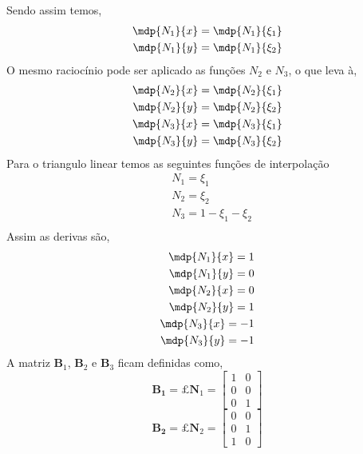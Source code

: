 %
Sendo assim temos,
%
\begin{equation}
	\begin{split}
		\mdp{N_1}{x} = \mdp{N_1}{\xi_1}\\
		\mdp{N_1}{y} = \mdp{N_1}{\xi_2}
	\end{split}
\end{equation}
%
O mesmo raciocínio pode ser aplicado as funções $N_2$ e $N_3$, o que leva à,
%
\begin{equation}
	\begin{split}
		\mdp{N_2}{x} = \mdp{N_2}{\xi_1}\\
		\mdp{N_2}{y} = \mdp{N_2}{\xi_2}\\
		\mdp{N_3}{x} = \mdp{N_3}{\xi_1}\\
		\mdp{N_3}{y} = \mdp{N_3}{\xi_2}
	\end{split}
\end{equation}
%
Para o triangulo linear temos as seguintes funções de interpolação
%
\begin{equation}
	\begin{split}
		&N_1 = \xi_1\\ 
		&N_2 = \xi_2\\ 
		&N_3 = 1 - \xi_1 - \xi_2\\ 
	\end{split}
\end{equation}
%
Assim as derivas são,
%
\begin{equation}
	\begin{split}
		\mdp{N_1}{x} = 1\\
		\mdp{N_1}{y} = 0\\
		\mdp{N_2}{x} = 0\\
		\mdp{N_2}{y} = 1\\
		\mdp{N_3}{x} = -1\\
		\mdp{N_3}{y} = -1
	\end{split}
\end{equation}
%
A matriz $\mathbf{B}_1$, $\mathbf{B}_2$ e $\mathbf{B}_3$ ficam definidas como,
%
\begin{equation}
	\mathbf{B_1} = \pounds \mathbf{N}_1 = 
	\begin{bmatrix}
		1& 0\\
		0& 0\\
		0& 1
	\end{bmatrix}
\end{equation}
%
\begin{equation}
	\mathbf{B_2} = \pounds \mathbf{N}_2 = 
	\begin{bmatrix}
		0& 0\\
		0& 1\\
		1& 0
	\end{bmatrix}
\end{equation}
